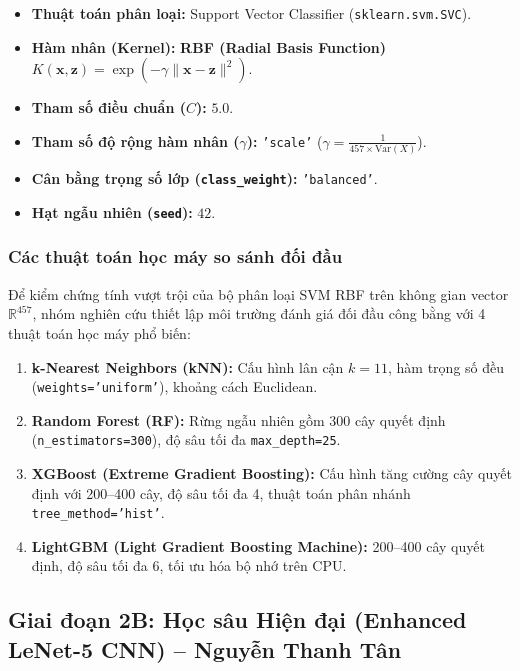 \begin{itemize}
    \item \textbf{Thuật toán phân loại:} Support Vector Classifier (\texttt{sklearn.svm.SVC}).
    \item \textbf{Hàm nhân (Kernel):} \textbf{RBF (Radial Basis Function)} $K(\mathbf{x}, \mathbf{z}) = \exp(-\gamma \|\mathbf{x} - \mathbf{z}\|^2)$.
    \item \textbf{Tham số điều chuẩn ($C$):} $5.0$.
    \item \textbf{Tham số độ rộng hàm nhân ($\gamma$):} \texttt{'scale'} ($\gamma = \frac{1}{457 \times \text{Var}(X)}$).
    \item \textbf{Cân bằng trọng số lớp (\texttt{class\_weight}):} \texttt{'balanced'}.
    \item \textbf{Hạt ngẫu nhiên (\texttt{seed}):} $42$.
\end{itemize}

\subsubsection{Các thuật toán học máy so sánh đối đầu}
\label{subsubsec:other_ml_models}

Để kiểm chứng tính vượt trội của bộ phân loại SVM RBF trên không gian vector $\mathbb{R}^{457}$, nhóm nghiên cứu thiết lập môi trường đánh giá đối đầu công bằng với 4 thuật toán học máy phổ biến:
\begin{enumerate}
    \item \textbf{k-Nearest Neighbors (kNN):} Cấu hình lân cận $k=11$, hàm trọng số đều (\texttt{weights='uniform'}), khoảng cách Euclidean.
    \item \textbf{Random Forest (RF):} Rừng ngẫu nhiên gồm 300 cây quyết định (\texttt{n\_estimators=300}), độ sâu tối đa \texttt{max\_depth=25}.
    \item \textbf{XGBoost (Extreme Gradient Boosting):} Cấu hình tăng cường cây quyết định với 200--400 cây, độ sâu tối đa 4, thuật toán phân nhánh \texttt{tree\_method='hist'}.
    \item \textbf{LightGBM (Light Gradient Boosting Machine):} 200--400 cây quyết định, độ sâu tối đa 6, tối ưu hóa bộ nhớ trên CPU.
\end{enumerate}

\subsection{Giai đoạn 2B: Học sâu Hiện đại (Enhanced LeNet-5 CNN) -- Nguyễn Thanh Tân}
\label{subsec:stage2_lenet}

